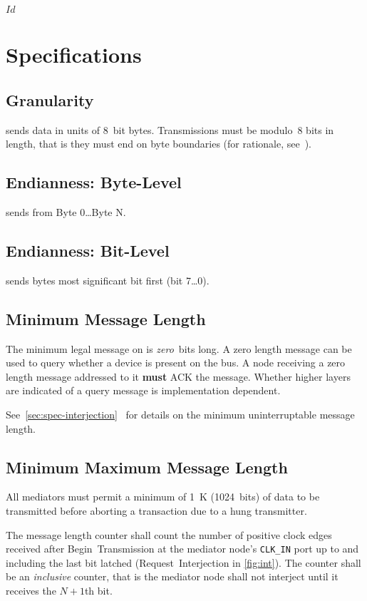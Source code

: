 \svnInfo $Id$

\section{Specifications}
\label{sec:spec}

\subsection{Granularity}
\label{sec:spec-granularity}
\bus sends data in units of 8~bit bytes. Transmissions must be modulo~8 bits
in length, that is they must end on byte boundaries (for rationale,
see~).

\subsection{Endianness: Byte-Level}
\bus sends from Byte 0{\ldots}Byte N.

\subsection{Endianness: Bit-Level}
\bus sends bytes most significant bit first (bit 7{\ldots}0).

\subsection{Minimum Message Length}
The minimum legal message on \bus is {\em zero}~bits long. A zero length
message can be used to query whether a device is present on the bus. A node
receiving a zero length message addressed to it {\bf must} ACK the message.
Whether higher layers are indicated of a query message is implementation
dependent.

See~\ref{sec:spec-interjection}~ for details on
the minimum uninterruptable message length.

\subsection{Minimum Maximum Message Length}
All \bus mediators must permit a minimum of 1~K (1024~bits) of data to be
transmitted before aborting a transaction due to a hung transmitter.

The message length counter shall count the number of positive clock edges
received after Begin~Transmission at the mediator node's {\tt CLK\_IN} port up
to and including the last bit latched (Request~Interjection in
\cref{fig:int}). The counter shall be an {\em inclusive} counter,
that is the mediator node shall not interject until it receives the $N+1$th
bit.

